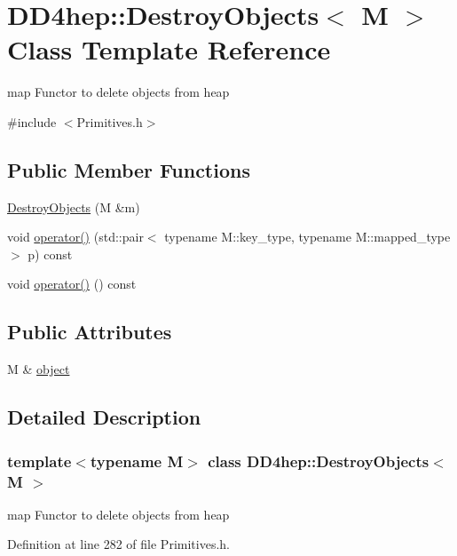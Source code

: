 \hypertarget{class_d_d4hep_1_1_destroy_objects}{
\section{DD4hep::DestroyObjects$<$ M $>$ Class Template Reference}
\label{class_d_d4hep_1_1_destroy_objects}
}


map Functor to delete objects from heap  


{\ttfamily \#include $<$Primitives.h$>$}\subsection*{Public Member Functions}
\begin{DoxyCompactItemize}
\item 
\hyperlink{class_d_d4hep_1_1_destroy_objects_afa755ee063407e0d37a4906a3a17f855}{DestroyObjects} (M \&m)
\item 
void \hyperlink{class_d_d4hep_1_1_destroy_objects_a59349f8bf81d99126b07646492e99134}{operator()} (std::pair$<$ typename M::key\_\-type, typename M::mapped\_\-type $>$ p) const 
\item 
void \hyperlink{class_d_d4hep_1_1_destroy_objects_ac47fb46f0197b9845bd9a22e8dced935}{operator()} () const 
\end{DoxyCompactItemize}
\subsection*{Public Attributes}
\begin{DoxyCompactItemize}
\item 
M \& \hyperlink{class_d_d4hep_1_1_destroy_objects_a6561f28791b7de118aefc686be64c55d}{object}
\end{DoxyCompactItemize}


\subsection{Detailed Description}
\subsubsection*{template$<$typename M$>$ class DD4hep::DestroyObjects$<$ M $>$}

map Functor to delete objects from heap 

Definition at line 282 of file Primitives.h.


